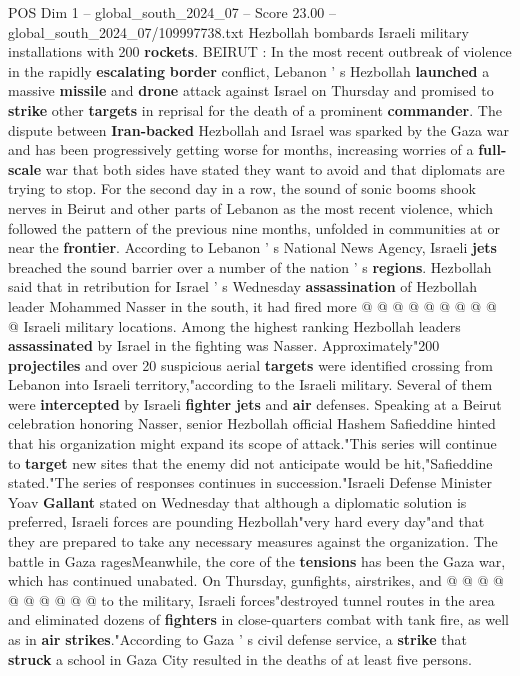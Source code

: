\begin{textsample}{POS Dim 1 – global\_south\_2024\_07 – Score 23.00 – global\_south\_2024\_07/109997738.txt}  \label{ex:f1_pos_069}
Hezbollah bombards Israeli military installations with 200 \textbf{rockets}.
BEIRUT : In the most recent outbreak of violence in the rapidly \textbf{escalating} \textbf{border} conflict, Lebanon ' s Hezbollah \textbf{launched} a massive \textbf{missile} and \textbf{drone} attack against Israel on Thursday and promised to \textbf{strike} other \textbf{targets} in reprisal for the death of a prominent \textbf{commander}.
The dispute between \textbf{Iran-backed} Hezbollah and Israel was sparked by the Gaza war and has been progressively getting worse for months, increasing worries of a \textbf{full-scale} war that both sides have stated they want to avoid and that diplomats are trying to stop.
For the second day in a row, the sound of sonic booms shook nerves in Beirut and other parts of Lebanon as the most recent violence, which followed the pattern of the previous nine months, unfolded in communities at or near the \textbf{frontier}.
According to Lebanon ' s National News Agency, Israeli \textbf{jets} breached the sound barrier over a number of the nation ' s \textbf{regions}.
Hezbollah said that in retribution for Israel ' s Wednesday \textbf{assassination} of Hezbollah leader Mohammed Nasser in the south, it had fired more @ @ @ @ @ @ @ @ @ @ Israeli military locations.
Among the highest ranking Hezbollah leaders \textbf{assassinated} by Israel in the fighting was Nasser.
Approximately"200 \textbf{projectiles} and over 20 suspicious aerial \textbf{targets} were identified crossing from Lebanon into Israeli territory,"according to the Israeli military.
Several of them were \textbf{intercepted} by Israeli \textbf{fighter} \textbf{jets} and \textbf{air} defenses.
Speaking at a Beirut celebration honoring Nasser, senior Hezbollah official Hashem Safieddine hinted that his organization might expand its scope of attack."This series will continue to \textbf{target} new sites that the enemy did not anticipate would be hit,"Safieddine stated."The series of responses continues in succession."Israeli Defense Minister Yoav \textbf{Gallant} stated on Wednesday that although a diplomatic solution is preferred, Israeli forces are pounding Hezbollah"very hard every day"and that they are prepared to take any necessary measures against the organization.
The battle in Gaza ragesMeanwhile, the core of the \textbf{tensions} has been the Gaza war, which has continued unabated.
On Thursday, gunfights, airstrikes, and @ @ @ @ @ @ @ @ @ @ to the military, Israeli forces"destroyed tunnel routes in the area and eliminated dozens of \textbf{fighters} in close-quarters combat with tank fire, as well as in \textbf{air} \textbf{strikes}."According to Gaza ' s civil defense service, a \textbf{strike} that \textbf{struck} a school in Gaza City resulted in the deaths of at least five persons.

\end{textsample}
